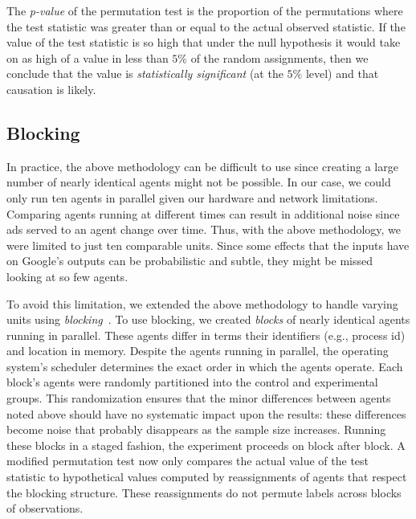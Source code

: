 \documentclass{article}
\begin{document}
The \emph{p-value} of the permutation test is the proportion of the permutations where the test statistic was greater than or equal to the actual observed statistic.
If the value of the test statistic is so high that under the null hypothesis it would  take on as high of a value in less than $5\%$ of the random assignments, then we conclude that the value is \emph{statistically significant} (at the $5\%$ level) and that causation is likely.  


\subsection{Blocking}
\label{sec:meth-block}

In practice, the above methodology can be difficult to use since creating a large number of nearly identical agents might not be possible.  In our case, we could only run ten agents in parallel given our hardware and network limitations.  Comparing agents running at different times can result in additional noise since ads served to an agent change over time.
Thus, with the above methodology, we were limited to just ten comparable units.  Since some effects that the inputs have on Google's outputs can be probabilistic and subtle, they might be missed looking at so few agents.

To avoid this limitation, we extended the above methodology to handle varying units using \emph{blocking}~\cite{good05book}.
To use blocking, we created \emph{blocks} of nearly identical agents running in parallel.  
These agents differ in terms their identifiers (e.g., process id) and location in memory.  Despite the agents running in parallel, the operating system's scheduler determines the exact order in which the agents operate.
Each block's agents were randomly partitioned into the control and experimental groups.  
This randomization ensures that the minor differences between agents noted above should have no systematic impact upon the results: these differences become noise that probably disappears as the sample size increases.
Running these blocks in a staged fashion, the experiment proceeds on block after block.  A modified permutation test now only compares the actual value of the test statistic to hypothetical values computed by reassignments of agents that respect the blocking structure.  These reassignments do not permute labels across blocks of observations.
\end{document}
